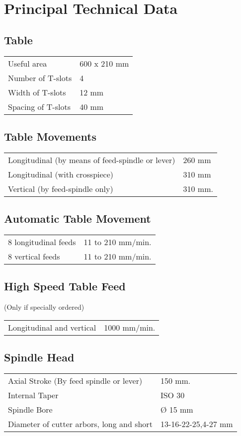 \chapter{Principal Technical Data}

\section*{Table}
\begin{tabularx}{\textwidth}{lX}
    Useful area        & 600 x 210 mm \\
    Number of T-slots  & 4            \\
    Width of T-slots   & 12 mm        \\
    Spacing of T-slots & 40 mm        \\
\end{tabularx}

\section*{Table Movements}
\begin{tabular}{ll}
    Longitudinal (by means of feed-spindle or lever) & 260 mm  \\
    Longitudinal (with crosspiece)                   & 310 mm  \\
    Vertical (by feed-spindle only)                  & 310 mm. \\
\end{tabular}

\section*{Automatic Table Movement}
\begin{tabular}{ll}
    8 longitudinal feeds & 11 to 210 mm/min. \\
    8 vertical feeds     & 11 to 210 mm/min. \\
\end{tabular}

\section*{High Speed Table Feed}
(Only if specially ordered)
\begin{tabular}{ll}
    Longitudinal and vertical & 1000 mm/min. \\
\end{tabular}

\section*{Spindle Head}
\begin{tabular}{ll}
    Axial Stroke (By feed spindle or lever)   & 150 mm.             \\
    Internal Taper                            & ISO 30              \\
    Spindle Bore                              & Ø 15 mm             \\
    Diameter of cutter arbors, long and short & 13-16-22-25,4-27 mm
\end{tabular}

